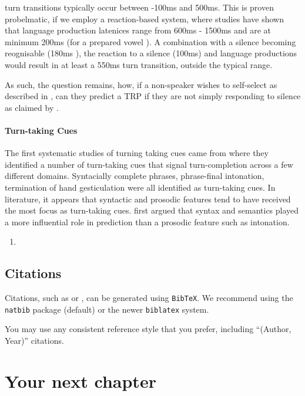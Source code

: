 \documentclass[logo,bsc,singlespacing,parskip]{infthesis}
\begin{document}
\cite{LevTor2015} turn transitions typically occur between -100ms and 500ms. This is proven probelmatic, if we employ a reaction-based system, where studies have shown that language production latenices range from 600ms - 1500ms \cite{IndLev2004, Bates2003} and are at minimum 200ms (for a prepared vowel \cite{Fry 1975}). A combination with a silence becoming reognisable (180ms \cite{}), the reaction to a silence (100ms) and language productions would result in at least a 550ms turn transition, outside the typical range. 

As such, the question remains, how, if a non-speaker wishes to self-select as described in \cite{Sacks1974}, can they predict a TRP if they are not simply responding to silence as claimed by \cite{HelEdl2010}. 

\subsubsection{Turn-taking Cues} 
The first systematic studies of turning taking cues came from \cite{Duncan1972, Duncan1974} where they identified a number of turn-taking cues that signal turn-completion across a few different domains. Syntacially complete phrases, phrase-final intonation, termination of hand gesticulation were all identified as turn-taking cues. In literature, it appears that syntactic and prosodic features tend to have received the most focus as turn-taking cues. \cite{Sacks1974} first argued that syntax and semantics played a more influential role in prediction than a prosodic feature such as intonation. 




\begin{enumerate} 
    \item 
\end{enumerate}


\section{Citations}

Citations, such as \citet{P1} or \citep{P2}, can be generated using
\texttt{BibTeX}. We recommend using the \texttt{natbib} package (default) or the newer \texttt{biblatex} system. 

You may use any consistent reference style that you prefer, including ``(Author, Year)'' citations. 

\chapter{Your next chapter}
\end{document}
